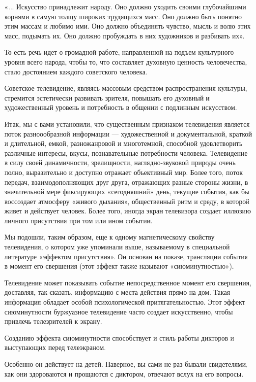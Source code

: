\documentclass[12pt, a4paper, openany]{book}
\begin{document}
«... Искусство принадлежит народу. Оно должно уходить своими глубочайшими корнями в самую толщу широких трудящихся масс. Оно должно быть понятно этим массам и любимо ими. Оно должно объединять чувство, мысль и волю этих масс, подымать их. Оно должно пробуждать в них художников и разбивать их». 

То есть речь идет о громадной работе, направленной на подъем культурного уровня всего народа, чтобы то, что составляет духовную ценность человечества, стало достоянием каждого советского человека. 

Советское телевидение, являясь массовым средством распространения культуры, стремится эстетически развивать зрителя, повышать его духовный и художественный уровень и потребность в общении с подлинным искусством. 

Итак, мы с вами установили, что существенным признаком телевидения является поток разноообразной информации — художественной и документальной, краткой и длительной, емкой, разножанровой и многотемной, способной удовлетворить различные интересы, вкусы, познавательные потребности человека. Телевидение в силу своей динамичности, зрелищности, наглядно-звуковой природы очень полно, выразительно и доступно отражает объективный мир. Более того, поток передач, взаимодополняющих друг друга, отражающих разные стороны жизни, в значительной мере фиксирующих «сегодняшний» день, текущие события, как бы воссоздает атмосферу «живого дыхания», общественный ритм и среду, в которой живет и действует человек. Более того, иногда экран телевизора создает иллюзию личного присутствия при том или ином событии. 

Мы подошли, таким образом, еще к одному магнетическому свойству телевидения, о котором уже упоминали выше, называемому в специальной литературе «эффектом присутствия». Он основан на показе, трансляции события в момент его свершения (этот эффект также называют «сиюминутностью»).

Телевидение может показывать событие непосредственное момент его свершения, доставляя, так сказать, информацию с места действия прямо на дом. Такая информация обладает особой психологической притягательностью. Этот эффект сиюминутности буржуазное телевидение часто создает искусственно, чтобы привлечь телезрителей к экрану. 

Созданию эффекта сиюминутности способствует и стиль работы дикторов и выступающих перед телеэкраном. 

Особенно он действует на детей. Наверное, вы сами не раз бывали свидетелями, как они здороваются и прощаются с диктором, отвечают вслух на его вопросы. 
\end{document}
